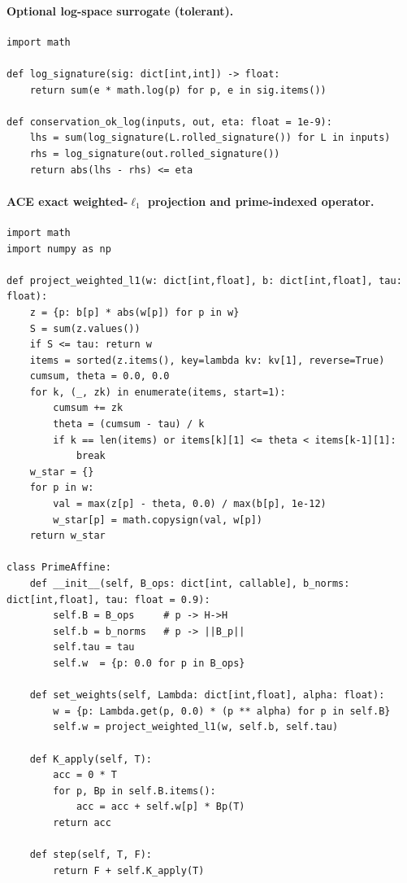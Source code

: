 \documentclass[11pt]{article}
\theoremstyle{definition}
\theoremstyle{remark}
\newcommand{\1}{\mathbf{1}}
\begin{document}
\paragraph{Optional log-space surrogate (tolerant).}
\begin{verbatim}
import math

def log_signature(sig: dict[int,int]) -> float:
    return sum(e * math.log(p) for p, e in sig.items())

def conservation_ok_log(inputs, out, eta: float = 1e-9):
    lhs = sum(log_signature(L.rolled_signature()) for L in inputs)
    rhs = log_signature(out.rolled_signature())
    return abs(lhs - rhs) <= eta
\end{verbatim}

\paragraph{ACE exact weighted-\(\ell_1\) projection and prime-indexed operator.}
\begin{verbatim}
import math
import numpy as np

def project_weighted_l1(w: dict[int,float], b: dict[int,float], tau: float):
    z = {p: b[p] * abs(w[p]) for p in w}
    S = sum(z.values())
    if S <= tau: return w
    items = sorted(z.items(), key=lambda kv: kv[1], reverse=True)
    cumsum, theta = 0.0, 0.0
    for k, (_, zk) in enumerate(items, start=1):
        cumsum += zk
        theta = (cumsum - tau) / k
        if k == len(items) or items[k][1] <= theta < items[k-1][1]:
            break
    w_star = {}
    for p in w:
        val = max(z[p] - theta, 0.0) / max(b[p], 1e-12)
        w_star[p] = math.copysign(val, w[p])
    return w_star

class PrimeAffine:
    def __init__(self, B_ops: dict[int, callable], b_norms: dict[int,float], tau: float = 0.9):
        self.B = B_ops     # p -> H->H
        self.b = b_norms   # p -> ||B_p||
        self.tau = tau
        self.w  = {p: 0.0 for p in B_ops}

    def set_weights(self, Lambda: dict[int,float], alpha: float):
        w = {p: Lambda.get(p, 0.0) * (p ** alpha) for p in self.B}
        self.w = project_weighted_l1(w, self.b, self.tau)

    def K_apply(self, T):
        acc = 0 * T
        for p, Bp in self.B.items():
            acc = acc + self.w[p] * Bp(T)
        return acc

    def step(self, T, F):
        return F + self.K_apply(T)
\end{verbatim}
\end{document}
